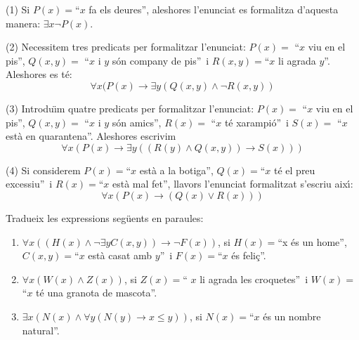 \begin{solucio}
(1) Si $P(x)=$\textquotedblleft$x$ fa els deures\textquotedblright, aleshores
l'enunciat es formalitza d'aquesta manera: $\exists x\lnot P(x)$.

(2) Necessitem tres predicats per formalitzar l'enunciat: $P(x)=$%
\textquotedblleft$x$ viu en el pis\textquotedblright, $Q(x,y)=$%
\textquotedblleft$x$ i $y$ s\'{o}n company de pis\textquotedblright\ i
$R(x,y)=$\textquotedblleft$x$ li agrada $y$\textquotedblright. Aleshores es
t\'{e}:%
\[
\forall x(P(x)\longrightarrow\exists y\left(  Q\left(  x,y\right)  \wedge\lnot
R\left(  x,y\right)  \right)
\]


(3) Introdu\"{\i}m quatre predicats per formalitzar l'enunciat: $P(x)=$%
\textquotedblleft$x$ viu en el pis\textquotedblright, $Q(x,y)=$%
\textquotedblleft$x$ i $y$ s\'{o}n amics\textquotedblright, $R(x)=$%
\textquotedblleft$x$ t\'{e} xarampi\'{o}\textquotedblright\ i $S(x)=$%
\textquotedblleft$x$ est\`{a} en quarantena\textquotedblright. Aleshores
escrivim%
\[
\forall x\left(  P(x)\longrightarrow\exists y\left(  \left(  R(y)\wedge
Q\left(  x,y\right)  \right)  \longrightarrow S(x)\right)  \right)
\]


(4) Si considerem $P(x)=$\textquotedblleft$x$ est\`{a} a la
botiga\textquotedblright, $Q(x)=$\textquotedblleft$x$ t\'{e} el preu
excessiu\textquotedblright\ i $R(x)=$\textquotedblleft$x$ est\`{a} mal
fet\textquotedblright, llavors l'enunciat formalitzat s'escriu aix\'{\i}:%
\[
\forall x\left(  P(x)\longrightarrow\left(  Q(x)\vee R(x)\right)  \right)
\]

\end{solucio}

\begin{exercici}
Tradueix les expressions seg\"{u}ents en paraules:

\begin{enumerate}
\item $\forall x\left(  \left(  H(x)\wedge\lnot\exists yC(x,y)\right)
\longrightarrow\lnot F(x)\right)  $, si $H(x)=$\textquotedblleft x \'{e}s un
home\textquotedblright, $C(x,y)=$\textquotedblleft$x$ est\`{a} casat amb $y
$\textquotedblright\ i $F(x)=$\textquotedblleft$x$ \'{e}s
feli\c{c}\textquotedblright.

\item $\forall x\left(  W(x)\wedge Z(x)\right)  $, si $Z(x)=$\textquotedblleft%
$x$ li agrada les croquetes\textquotedblright\ i $W(x)=$\textquotedblleft$x$
t\'{e} una granota de mascota\textquotedblright.

\item $\exists x\left(  N(x)\wedge\forall y\left(  N(y)\longrightarrow x\leq
y\right)  \right)  $, si $N(x)=$\textquotedblleft$x$ \'{e}s un nombre
natural\textquotedblright.
\end{enumerate}
\end{exercici}

